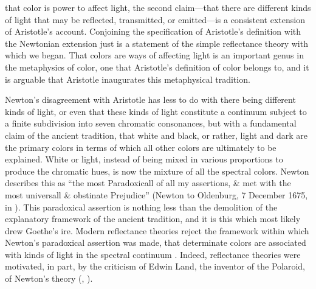 that color is power to affect light, the second claim---that there are different kinds of light that may be reflected, transmitted, or emitted---is a consistent extension of Aristotle's account. Conjoining the specification of Aristotle's definition with the Newtonian extension just is a statement of the simple reflectance theory with which we began. That colors are ways of affecting light is an important genus in the metaphysics of color, one that Aristotle's definition of color belongs to, and it is arguable that Aristotle inaugurates this metaphysical tradition.

Newton's disagreement with Aristotle has less to do with there being different kinds of light, or even that these kinds of light constitute a continuum subject to a finite subdivision into seven chromatic consonances, but with a fundamental claim of the ancient tradition, that white and black, or rather, light and dark are the primary colors in terms of which all other colors are ultimately to be explained. White or light, instead of being mixed in various proportions to produce the chromatic hues, is now the mixture of all the spectral colors. Newton describes this as ``the most Paradoxicall of all my assertions, \& met with the most universall \& obstinate Prejudice'' (Newton to Oldenburg, 7 December 1675, in \citealt[385]{Turnbull:1959kx}). This paradoxical assertion is nothing less than the demolition of the explanatory framework of the ancient tradition, and it is this which most likely drew Goethe's ire. Modern reflectance theories reject the framework within which Newton's paradoxical assertion was made, that determinate colors are associated with kinds of light in the spectral continuum \citep{Hilbert:1987jq}. Indeed, reflectance theories were motivated, in part, by the criticism of Edwin Land, the inventor of the Polaroid, of Newton's theory (\citealt{Land:1971aa}, \citealt{Land:1977aa}).


